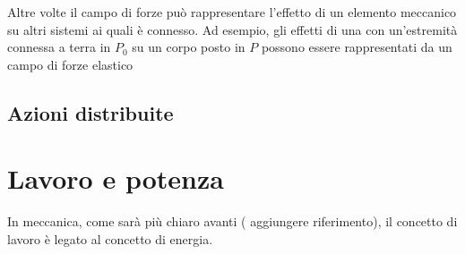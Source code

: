 \documentclass[letterpaper,10pt,italian]{jupyterBook}
\begin{document}
\sphinxAtStartPar
Altre volte il campo di forze può rappresentare l’effetto di un elemento meccanico su altri sistemi ai quali è connesso. Ad esempio, gli effetti di una {\hyperref[\detokenize{ch/mechanics/actions-examples:physics-hs-mechanics-actions-gravitation-spring}]{}} con un’estremità connessa a terra in \(P_0\) su un corpo posto in \(P\) possono essere rappresentati da un campo di forze elastico


\subsection{Azioni distribuite}
\label{\detokenize{ch/mechanics/actions-types:azioni-distribuite}}\label{\detokenize{ch/mechanics/actions-types:physics-hs-mechanics-actions-def-density}}
\sphinxAtStartPar
{}

\sphinxstepscope




\section{Lavoro e potenza}
\label{\detokenize{ch/mechanics/actions-work:lavoro-e-potenza}}\label{\detokenize{ch/mechanics/actions-work:physics-hs-mechanics-actions-work}}\label{\detokenize{ch/mechanics/actions-work::doc}}
\sphinxAtStartPar
In meccanica, come sarà più chiaro avanti ( aggiungere riferimento), il concetto di lavoro è legato al concetto di energia. 
\end{document}
